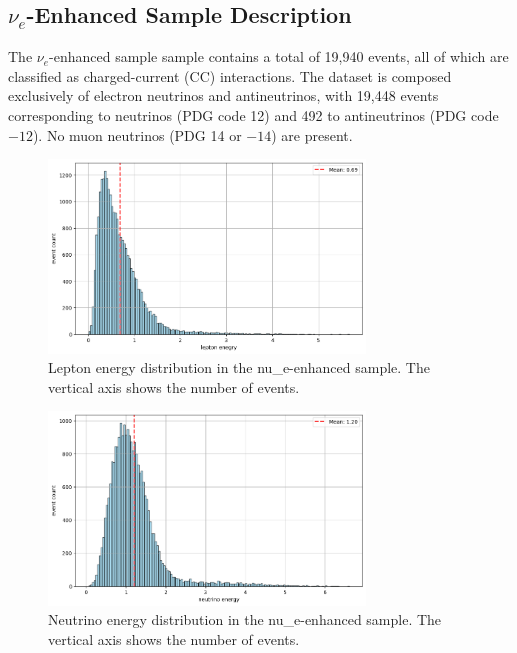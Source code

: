 \documentclass{pracalicmgr}
\begin{document}
\subsection{\texorpdfstring{$\nu_e$}{νₑ}-Enhanced Sample Description}

The $\nu_e$-enhanced sample sample contains a total of 19,940 events, all of which are classified as charged-current (CC) interactions. The dataset is composed exclusively of electron neutrinos and antineutrinos, with 19,448 events corresponding to neutrinos (PDG code 12) and 492 to antineutrinos (PDG code $-12$). No muon neutrinos (PDG 14 or $-14$) are present.

\begin{figure}[H]
    \centering
    \includegraphics[width=0.75\textwidth]{src/leptonElectron.png}
    \caption{Lepton energy distribution in the nu\_e-enhanced sample. The vertical axis shows the number of events.}
    \label{fig:lepton-nue}
\end{figure}

\begin{figure}[H]
    \centering
    \includegraphics[width=0.75\textwidth]{src/neutrinoElectron.png}
    \caption{Neutrino energy distribution in the nu\_e-enhanced sample. The vertical axis shows the number of events.}
    \label{fig:neutrino-nue}
\end{figure}
\end{document}

